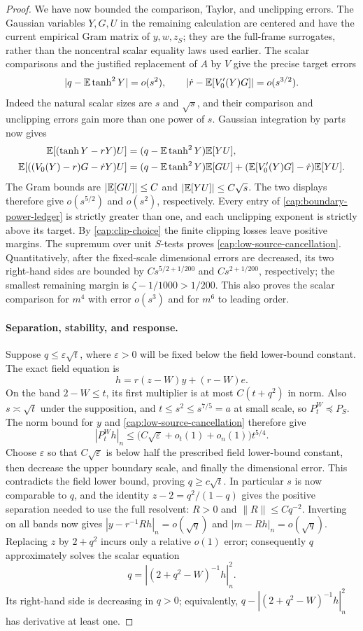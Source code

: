\begin{proof}
We have now bounded the comparison, Taylor, and unclipping errors. The
Gaussian variables \(Y,G,U\) in the remaining calculation are centered and
have the current empirical Gram matrix of \(y,w,z_S\); they are the
full-frame surrogates, rather than the noncentral scalar equality laws used
earlier. The scalar comparisons and the justified replacement of \(A\) by
\(V\) give the precise target errors
\[
 |q-\mathbb E\tanh^2Y|=o(s^2),\qquad
 |\dot r-\mathbb E[V'_0(Y)G]|=o(s^{3/2}).
\]
Indeed the natural scalar sizes are \(s\) and \(\sqrt s\), and their
comparison and unclipping errors gain more than one power of \(s\).
Gaussian integration by parts now gives
\[
 \begin{split}
 \mathbb E[(\tanh Y-rY)U]
   &=(q-\mathbb E\tanh^2Y)\mathbb E[YU],\\
 \mathbb E[((V_0(Y)-r)G-\dot rY)U]
   &=(q-\mathbb E\tanh^2Y)\mathbb E[GU]
     +(\mathbb E[V'_0(Y)G]-\dot r)\mathbb E[YU].
 \end{split}
\]
The Gram bounds are \(|\mathbb E[GU]|\le C\) and \(|\mathbb E[YU]|\le C\sqrt s\).
The two displays therefore give \(o(s^{5/2})\) and \(o(s^2)\),
respectively. Every entry of
\eqref{cap:boundary-power-ledger} is strictly greater than one, and each
unclipping exponent is strictly above its target. By \eqref{cap:clip-choice}
the finite clipping losses leave positive margins. The supremum over unit
$S$-tests proves \eqref{cap:low-source-cancellation}. Quantitatively, after
the fixed-scale dimensional errors are decreased, its two right-hand sides are
bounded by $Cs^{5/2+1/200}$ and $Cs^{2+1/200}$, respectively; the smallest
remaining margin is $\zeta-1/1000>1/200$. This also proves the scalar
comparison for $m^4$ with error $o(s^3)$ and for $m^6$ to leading order.

\paragraph{Separation, stability, and response.}
Suppose \(q\le\varepsilon\sqrt t\), where \(\varepsilon>0\) will be fixed
below the field lower-bound constant.
The exact field equation is
\[
 h=r(z-W)y+(r-W)e.
\]
On the band \(2-W\le t\), its first multiplier is at most \(C(t+q^2)\)
in norm. Also \(s\asymp\sqrt t\) under the supposition, and
\(t\le s^2\le s^{7/5}=a\) at small scale, so
\(P_t^W\preceq P_S\). The norm bound for \(y\) and
\eqref{cap:low-source-cancellation} therefore give
\[
 |P_t^Wh|_n
 \le\bigl(C\sqrt\varepsilon+o_t(1)+o_n(1)\bigr)t^{5/4}.
\]
Choose \(\varepsilon\) so that \(C\sqrt\varepsilon\) is below half the
prescribed field lower-bound constant, then decrease the upper boundary
scale, and finally the dimensional error. This contradicts the field lower
bound, proving \(q\ge c\sqrt t\). In particular \(s\) is now comparable to
\(q\), and the identity
$z-2=q^2/(1-q)$ gives the positive separation needed to use the full
resolvent: $R>0$ and $\|R\|\le Cq^{-2}$. Inverting on all bands now gives
$|y-r^{-1}Rh|_n=o(\sqrt q)$ and $|m-Rh|_n=o(\sqrt q)$. Replacing $z$ by
$2+q^2$ incurs only a relative $o(1)$ error; consequently $q$ approximately
solves the scalar equation
\[
 q=|(2+q^2-W)^{-1}h|_n^2.
\]
Its right-hand side is decreasing in \(q>0\); equivalently,
\(q-|(2+q^2-W)^{-1}h|_n^2\) has derivative at least one.


\end{proof}
